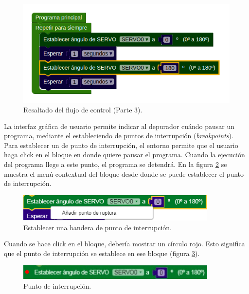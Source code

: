 \begin{figure}[!htbp]
	\begin{center}  %
		\includegraphics[width=12cm]{./Figures/debugPaso3.PNG}
		\par\caption{Resaltado del flujo de control (Parte 3).}\label{fig:debugPaso3}
	\end{center}
\end{figure}

La interfaz gráfica de usuario permite indicar al depurador cuándo pausar un programa, mediante el estableciendo de puntos de interrupción (\emph{breakpoints}).
Para establecer un de punto de interrupción, el entorno permite que el usuario haga click en el bloque en donde quiere pausar el programa. Cuando la ejecución del programa llege a este punto, el programa se detendrá. En la figura \ref{fig:add-breakpoint} se muestra el menú contextual del bloque desde donde se puede establecer el punto de interrupción.

\begin{figure}[!htbp]
	\centering
	\includegraphics[width=10cm]{./Figures/add-breakpoint.PNG}
	\caption{Establecer una bandera de punto de interrupción.}
	\label{fig:add-breakpoint}
\end{figure}

Cuando se hace click en el bloque, debería mostrar un círculo rojo. Esto significa que el punto de interrupción se establece en ese bloque (figura \ref{fig:breakpoint}).

\begin{figure}[!htbp]
	\centering
	\includegraphics[width=10cm]{./Figures/breakpoint.PNG}
	\caption{Punto de interrupción.}
	\label{fig:breakpoint}
\end{figure}


